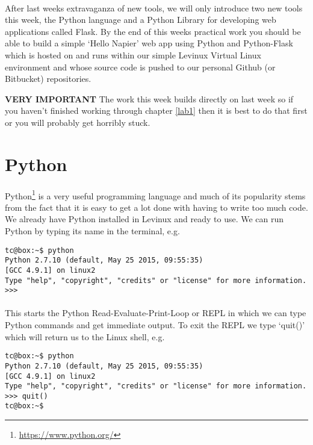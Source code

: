 \documentclass[12pt, a4paper, twoside]{book}
\begin{document}
\paragraph{} After last weeks extravaganza of new tools, we will only introduce two new tools this week, the Python language and a Python Library for developing web applications called Flask. By the end of this weeks practical work you should be able to build a simple `Hello Napier' web app using Python and Python-Flask which is hosted on and runs within our simple Levinux Virtual Linux environment and whose source code is pushed to our personal Github (or Bitbucket) repositories. 

\begin{framed}
\textbf{VERY IMPORTANT} The work this week builds directly on last week so if you haven't finished working through chapter \ref{lab1} then it is best to do that first or you will probably get horribly stuck.
\end{framed}

\section{Python}
\label{python}
\paragraph{} Python\footnote{\url{https://www.python.org/}} is a very useful programming language and much of its popularity stems from the fact that it is easy to get a lot done with having to write too much code. We already have Python installed in Levinux and ready to use. We can run Python by typing its name in the terminal, e.g.

\begin{lstlisting}[style=DOS]
tc@box:~$ python
Python 2.7.10 (default, May 25 2015, 09:55:35) 
[GCC 4.9.1] on linux2
Type "help", "copyright", "credits" or "license" for more information.
>>> 
\end{lstlisting}
\paragraph{} This starts the Python Read-Evaluate-Print-Loop or REPL in which we can type Python commands and get immediate output. To exit the REPL we type `quit()' which will return us to the Linux shell, e.g.

\begin{lstlisting}[style=DOS]
tc@box:~$ python
Python 2.7.10 (default, May 25 2015, 09:55:35) 
[GCC 4.9.1] on linux2
Type "help", "copyright", "credits" or "license" for more information.
>>> quit()
tc@box:~$ 
\end{lstlisting}
\end{document}
